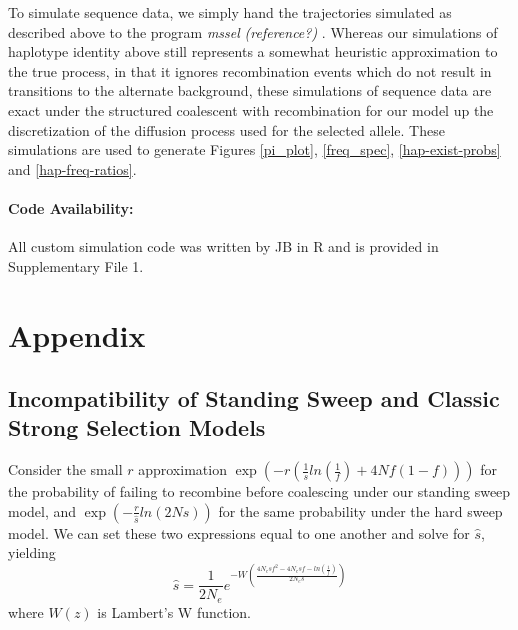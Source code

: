 \documentclass[a4paper,10pt]{article}
\newcommand{\jb}[1]{{\it\color{blue} (#1)} }
\begin{document}
To simulate sequence data, we simply hand the trajectories simulated as described above to the program \textit{mssel} \jb{reference?}. Whereas our simulations of haplotype identity above still represents a somewhat heuristic approximation to the true process, in that it ignores recombination events which do not result in transitions to the alternate background, these simulations of sequence data are exact under the structured coalescent with recombination for our model up the discretization of the diffusion process used for the selected allele. These simulations are used to generate Figures \ref{pi_plot}, \ref{freq_spec}, \ref{hap-exist-probs} and \ref{hap-freq-ratios}.

\paragraph{Code Availability:} All custom simulation code was written by JB in R and is provided in Supplementary File 1.
\section*{Appendix}

\subsection*{Incompatibility of Standing Sweep and Classic Strong Selection Models}

Consider the small $r$ approximation $\exp\left( -r \left(\frac{1}{s}ln\left(\frac{1}{f}\right) + 4Nf\left(1-f\right)\right) \right)$ for the probability of failing to recombine before coalescing under our standing sweep model, and $\exp\left( - \frac{r}{\hat{s}}ln\left(2N\hat{s}\right) \right)$ for the same probability under the hard sweep model. We can set these two expressions equal to one another and solve for $\hat{s}$, yielding
\begin{equation}
	\hat{s} = \frac{1}{2N_e} e^{-W\left(\frac{4N_e sf^2 - 4N_e s f  - ln \left( \frac{1}{f} \right)}{2N_es}\right)}
\end{equation}
where $W\left(z\right)$ is Lambert's W function. 
\end{document}
